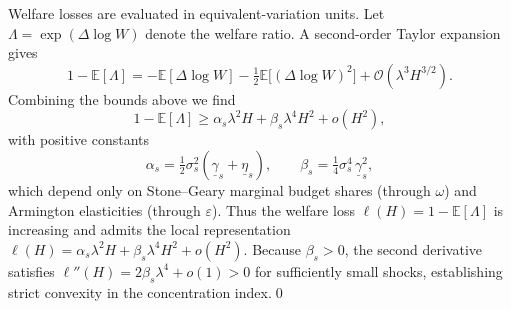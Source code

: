 Welfare losses are evaluated in equivalent-variation units. Let $\Lambda = \exp(\Delta \log W)$ denote the welfare ratio. A second-order Taylor expansion gives
\begin{equation*}
    1 - \mathbb{E}[\Lambda] = -\mathbb{E}[\Delta \log W] - \tfrac{1}{2}\mathbb{E}\bigl[(\Delta \log W)^2\bigr] + \mathcal{O}(\lambda^3 H^{3/2}).
\end{equation*}
Combining the bounds above we find
\begin{equation*}
    1 - \mathbb{E}[\Lambda] \geq \alpha_s\lambda^2 H + \beta_s\lambda^4 H^2 + o(H^2),
\end{equation*}
with positive constants
\begin{equation*}
    \alpha_s = \tfrac{1}{2}\sigma_s^2(\underline{\gamma}_s + \underline{\eta}_s), \qquad \beta_s = \tfrac{1}{4}\sigma_s^4\,\underline{\gamma}_s^2,
\end{equation*}
which depend only on Stone--Geary marginal budget shares (through $\omega$) and Armington elasticities (through $\varepsilon$). Thus the welfare loss $\ell(H) = 1 - \mathbb{E}[\Lambda]$ is increasing and admits the local representation $\ell(H) = \alpha_s\lambda^2 H + \beta_s\lambda^4 H^2 + o(H^2)$. Because $\beta_s>0$, the second derivative satisfies $\ell''(H) = 2\beta_s\lambda^4 + o(1) > 0$ for sufficiently small shocks, establishing strict convexity in the concentration index.\qed

